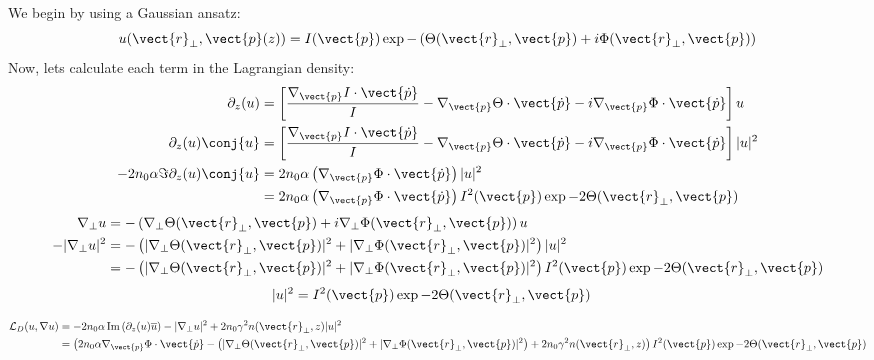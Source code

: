 We begin by using a Gaussian ansatz:
\begin{equation}
    u(\vect{r}_{\perp},\vect{p}(z)) = I(\vect{p}) \exp{- \left(\Theta(\vect{r}_{\perp},\vect{p}) + i \Phi(\vect{r}_{\perp},\vect{p}) \right)}
\end{equation}
Now, lets calculate each term in the Lagrangian density:
\begin{equation}
    \begin{split}
    \partial_{z}(u) &= \left[ \frac{\nabla_{\vect{p}}{I}\cdot\vect{\dot{p}}}{I} - \nabla_{\vect{p}}{\Theta}\cdot\vect{\dot{p}} - i \nabla_{\vect{p}}{\Phi}\cdot\vect{\dot{p}} \right] u\\
    \partial_{z}(u)\conj{u} &= \left[ \frac{\nabla_{\vect{p}}{I}\cdot\vect{\dot{p}}}{I} -\nabla_{\vect{p}}{\Theta}\cdot\vect{\dot{p}} - i \nabla_{\vect{p}}{\Phi}\cdot\vect{\dot{p}} \right] |u|^2 \\
   -2 n_0 \alpha \Im{\partial_{z}(u)\conj{u}} &= 2 n_0 \alpha \left(\nabla_{\vect{p}}{\Phi}\cdot\vect{\dot{p}}\right) |u|^2 \\    
   &= 2 n_0 \alpha \left(\nabla_{\vect{p}}{\Phi}\cdot\vect{\dot{p}}\right) I^2(\vect{p})\exp{-2 \Theta(\vect{r}_{\perp},\vect{p})} \\    
    \end{split}
\end{equation}
\begin{equation}
    \begin{split}
        \nabla_{\perp} u &= -\left(\nabla_{\perp}\Theta(\vect{r}_{\perp},\vect{p}) + i \nabla_{\perp}\Phi(\vect{r}_{\perp},\vect{p}) \right) u \\
    -|\nabla_{\perp} u|^2 &= - \left(|\nabla_{\perp}\Theta(\vect{r}_{\perp},\vect{p})|^2 + |\nabla_{\perp}\Phi(\vect{r}_{\perp},\vect{p})|^2 \right)|u|^2 \\
    &= - \left(|\nabla_{\perp}\Theta(\vect{r}_{\perp},\vect{p})|^2 + |\nabla_{\perp}\Phi(\vect{r}_{\perp},\vect{p})|^2 \right)I^2(\vect{p})\exp{-2 \Theta(\vect{r}_{\perp},\vect{p})} 
    \end{split}
\end{equation}
\begin{equation}
    \begin{split}
    |u|^2 &= I^2(\vect{p})\exp{-2 \Theta(\vect{r}_{\perp},\vect{p})}  
    \end{split}
\end{equation}

\begin{equation}
\begin{split}
    \mathcal{L}_{D}(u,\nabla u) &= -2 n_0 \alpha\, \mathrm{Im}\left(\partial_{z}(u) \overline{u}\right) - |\nabla_{\perp} u|^2 + 2n_0 \gamma^2 n(\vect{r}_{\perp},z) |u|^2 \\
    & = \left(2 n_0 \alpha \nabla_{\vect{p}}{\Phi}\cdot\vect{\dot{p}} - \left(|\nabla_{\perp}\Theta(\vect{r}_{\perp},\vect{p})|^2 + |\nabla_{\perp}\Phi(\vect{r}_{\perp},\vect{p})|^2 \right) + 2n_0 \gamma^2 n(\vect{r}_{\perp},z)\right) I^2(\vect{p})\exp{-2 \Theta(\vect{r}_{\perp},\vect{p})}
\end{split}
\end{equation}

